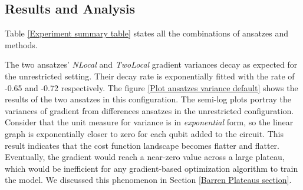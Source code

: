 \subsection{Results and Analysis} \label{Result section}

Table \ref{Experiment summary table} states all the combinations of ansatzes and methods.

The two ansatzes' \emph{NLocal} and \emph{TwoLocal} gradient variances decay as expected for the unrestricted setting.
Their decay rate is exponentially fitted with the rate of -0.65 and -0.72 respectively.
The figure \ref{Plot ansatzes variance default} shows the results of the two ansatzes in this configuration.
The semi-log plots portray the variances of gradient from differences ansatzes in the unrestricted configuration.
Consider that the unit measure for variance is in \emph{exponential} form, so the linear graph is exponentially closer to zero for each qubit added to the circuit.
This result indicates that the cost function landscape becomes flatter and flatter.
Eventually, the gradient would reach a near-zero value across a large plateau, which would be inefficient for any gradient-based optimization algorithm to train the model.
We discussed this phenomenon in Section \ref{Barren Plateaus section}.



